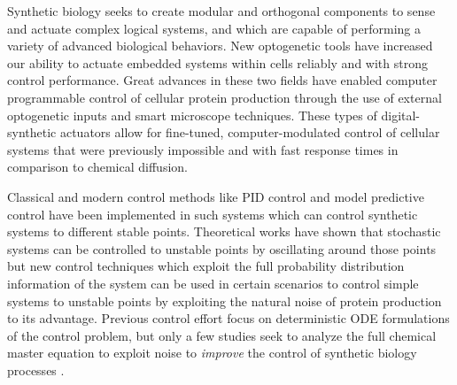 \documentclass[12pt]{article}
\begin{document}
Synthetic biology seeks to create modular\cite{Ng2019} and orthogonal\cite{Liu2018} components to sense and actuate\cite{Sheets2020} complex logical systems\cite{Groseclose2020}, and which are capable of performing a variety of advanced biological behaviors\cite{Shin2020}. 
New optogenetic tools have increased our ability to actuate embedded systems within cells reliably and with strong control performance\cite{Sheets2020,Baumschlager2017,Chen2020,Lillacci2018}. Great advances in these two fields have enabled computer programmable control of cellular protein production through the use of external optogenetic inputs and smart microscope techniques\cite{Fox2021,Baumschlager2021,Lugagne2017}. These types of digital-synthetic actuators allow for fine-tuned, computer-modulated control of cellular systems that were previously impossible\cite{Rullan2018, Baumschlager2017} and with fast response times in comparison to chemical diffusion. 

Classical and modern control methods like PID control and model predictive control have been implemented in such systems\cite{} which can control synthetic systems to different stable points. 
Theoretical works have shown that stochastic systems can be controlled to unstable points by oscillating around those points \cite{Guarino2020} but new control techniques which exploit the full probability distribution information of the system can be used in certain scenarios to control simple systems to unstable points by exploiting the natural noise of protein production to its advantage. Previous control effort focus on deterministic ODE formulations of the control problem, but only a few studies seek to analyze the full chemical master equation to exploit noise to {\em improve} the control of synthetic biology processes \cite{Szymanska2015,May2021}.  
\end{document}
